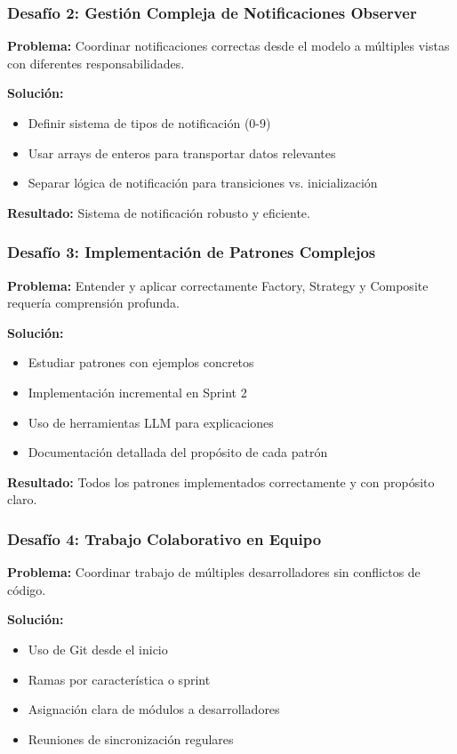 \documentclass[12pt, a4paper]{article}
\begin{document}
\subsubsection{Desafío 2: Gestión Compleja de Notificaciones Observer}

\textbf{Problema:} Coordinar notificaciones correctas desde el modelo a múltiples vistas con diferentes responsabilidades.

\textbf{Solución:}
\begin{itemize}[leftmargin=1.5em]
    \item Definir sistema de tipos de notificación (0-9)
    \item Usar arrays de enteros para transportar datos relevantes
    \item Separar lógica de notificación para transiciones vs. inicialización
\end{itemize}

\textbf{Resultado:} Sistema de notificación robusto y eficiente.

\subsubsection{Desafío 3: Implementación de Patrones Complejos}

\textbf{Problema:} Entender y aplicar correctamente Factory, Strategy y Composite requería comprensión profunda.

\textbf{Solución:}
\begin{itemize}[leftmargin=1.5em]
    \item Estudiar patrones con ejemplos concretos
    \item Implementación incremental en Sprint 2
    \item Uso de herramientas LLM para explicaciones
    \item Documentación detallada del propósito de cada patrón
\end{itemize}

\textbf{Resultado:} Todos los patrones implementados correctamente y con propósito claro.

\subsubsection{Desafío 4: Trabajo Colaborativo en Equipo}

\textbf{Problema:} Coordinar trabajo de múltiples desarrolladores sin conflictos de código.

\textbf{Solución:}
\begin{itemize}[leftmargin=1.5em]
    \item Uso de Git desde el inicio
    \item Ramas por característica o sprint
    \item Asignación clara de módulos a desarrolladores
    \item Reuniones de sincronización regulares
\end{itemize}
\end{document}
